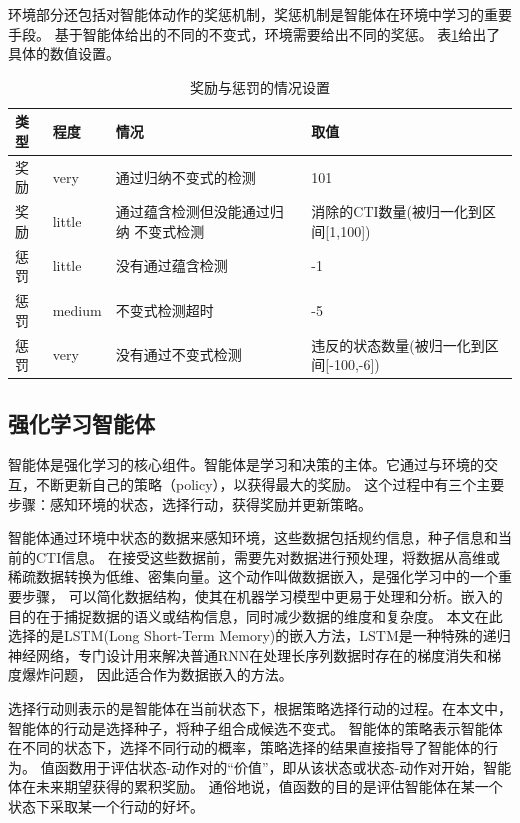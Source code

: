 环境部分还包括对智能体动作的奖惩机制，奖惩机制是智能体在环境中学习的重要手段。
基于智能体给出的不同的不变式，环境需要给出不同的奖惩。
表\ref{tab:award_punish}给出了具体的数值设置。
\begin{table}[!htbp]
	\centering
	\caption{奖励与惩罚的情况设置}
	\renewcommand\arraystretch{1.4}
	\begin{tabular}{p{}p{}p{}p{}}
		\toprule
		\textbf{类型}&\textbf{程度}&\textbf{情况}&\textbf{取值}\\
		\midrule
		奖励&very&通过归纳不变式的检测&101\\
		奖励&little&通过蕴含检测但没能通过归纳
		不变式检测&消除的CTI数量(被归一化到区间[1,100])\\
		惩罚&little&没有通过蕴含检测&-1\\
		惩罚&medium&不变式检测超时&-5\\
		惩罚&very&没有通过不变式检测&违反的状态数量(被归一化到区间[-100,-6]) \\   
		\bottomrule
	\end{tabular}
        \label{tab:award_punish}
\end{table}

\subsection{强化学习智能体}
智能体是强化学习的核心组件。智能体是学习和决策的主体。它通过与环境的交互，不断更新自己的策略（policy），以获得最大的奖励。
这个过程中有三个主要步骤：感知环境的状态，选择行动，获得奖励并更新策略。

智能体通过环境中状态的数据来感知环境，这些数据包括规约信息，种子信息和当前的CTI信息。
在接受这些数据前，需要先对数据进行预处理，将数据从高维或稀疏数据转换为低维、密集向量。这个动作叫做数据嵌入，是强化学习中的一个重要步骤，
可以简化数据结构，使其在机器学习模型中更易于处理和分析。嵌入的目的在于捕捉数据的语义或结构信息，同时减少数据的维度和复杂度。
本文在此选择的是LSTM(Long Short-Term Memory)的嵌入方法，LSTM是一种特殊的递归神经网络，专门设计用来解决普通RNN在处理长序列数据时存在的梯度消失和梯度爆炸问题，
因此适合作为数据嵌入的方法。

选择行动则表示的是智能体在当前状态下，根据策略选择行动的过程。在本文中，智能体的行动是选择种子，将种子组合成候选不变式。
智能体的策略表示智能体在不同的状态下，选择不同行动的概率，策略选择的结果直接指导了智能体的行为。
值函数用于评估状态-动作对的“价值”，即从该状态或状态-动作对开始，智能体在未来期望获得的累积奖励。
通俗地说，值函数的目的是评估智能体在某一个状态下采取某一个行动的好坏。

